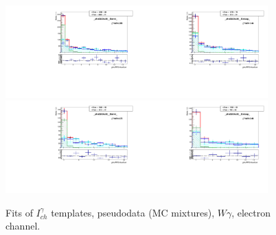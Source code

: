 \begin{figure}[htb]
\begin{center}
   \includegraphics[width=0.45\textwidth]{../figs/figs_v11/ELECTRON_WGamma/TemplateFits/c_TEMPL_CHISO_UNblind__phoEt25to30__Barrel__RooFit_MCclosure.pdf}\includegraphics[width=0.45\textwidth]{../figs/figs_v11/ELECTRON_WGamma/TemplateFits/c_TEMPL_CHISO_UNblind__phoEt25to30__Endcap__RooFit_MCclosure.pdf}\\
   \includegraphics[width=0.45\textwidth]{../figs/figs_v11/ELECTRON_WGamma/TemplateFits/c_TEMPL_CHISO_UNblind__phoEt30to35__Barrel__RooFit_MCclosure.pdf}\includegraphics[width=0.45\textwidth]{../figs/figs_v11/ELECTRON_WGamma/TemplateFits/c_TEMPL_CHISO_UNblind__phoEt30to35__Endcap__RooFit_MCclosure.pdf}\\
  \label{fig:templateFits_MCclosure_CHISO_ELECTRON_1}
  \caption{Fits of $I_{ch}^{\gamma}$ templates, pseudodata (MC mixtures), $W\gamma$, electron channel.}
  \end{center}
\end{figure}

